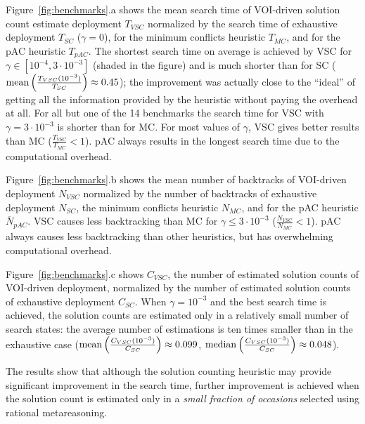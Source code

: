 Figure~\ref{fig:benchmarks}.a shows the mean search time of VOI-driven
solution count estimate deployment $T_{VSC}$ normalized by the search
time of exhaustive deployment $T_{SC}$ ($\gamma=0$), for the minimum
conflicts heuristic $T_{MC}$, and for the pAC heuristic $T_{pAC}$.
The shortest search time on average is achieved by VSC for $\gamma \in
[10^{-4},3\cdot10^{-3}]$ (shaded in the figure) and is much shorter
than for SC ($\mathop{\mathrm{mean}} \left(\frac {T_{VSC}(10^{-3})}
{T_{SC}}\right)\approx 0.45$); the improvement was
  actually close to the ``ideal'' of getting all the information
  provided by the heuristic without paying the overhead at all. For
all but one of the 14 benchmarks the search time for VSC with
$\gamma=3\cdot10^{-3}$ is shorter than for MC. For most values of
$\gamma$, VSC gives better results than MC ($\frac {T_{VSC}} {T_{MC}}
< 1$). pAC always results in the longest search time due to the
computational overhead.

Figure~\ref{fig:benchmarks}.b shows the mean number of backtracks of
VOI-driven deployment $N_{VSC}$ normalized by the
number of backtracks of exhaustive deployment $N_{SC}$,
the minimum conflicts heuristic $N_{MC}$, and for
the pAC heuristic $\overline N_{pAC}$. VSC causes less backtracking
than MC for $\gamma\le 3\cdot10^{-3}$ ($\frac {N_{VSC}}  {N_{MC}} <
1$). pAC always causes less backtracking than other heuristics, but
has overwhelming computational overhead.

Figure~\ref{fig:benchmarks}.c shows $C_{VSC}$, the number of
estimated solution counts of VOI-driven deployment, normalized by the
number of estimated solution counts of exhaustive deployment
$C_{SC}$. When $\gamma=10^{-3}$ and the best search time is achieved,
the solution counts are estimated  only in a relatively small number
of search states: the average number of estimations is ten times smaller than in the
exhaustive case ($\mathop{\mathrm{mean}}\left(\frac {C_{VSC}(10^{-3})}
{C_{SC}}\right)\approx 0.099$, $\mathop{\mathrm{median}}\left(\frac {C_{VSC}(10^{-3})}
{C_{SC}}\right)\approx 0.048$). 

The results show that although the solution counting heuristic
may provide significant improvement in the search time, further improvement is
achieved when the solution count is estimated only in a \emph{small fraction of
occasions} selected using rational metareasoning.

